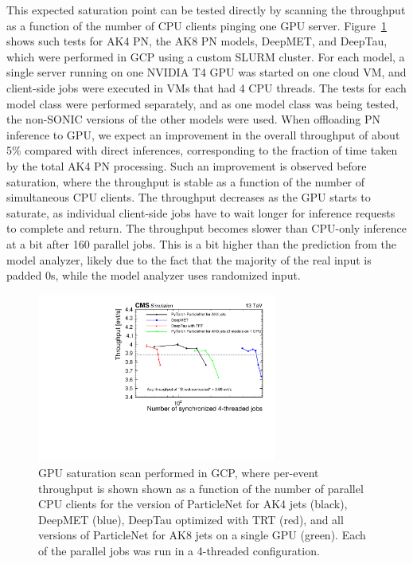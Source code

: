 This expected saturation point can be tested directly by scanning the throughput as a function of the number of CPU clients pinging one GPU server. Figure~\ref{fig:throughputs_scan_pn} shows such tests for AK4 PN, the AK8 PN models, DeepMET, and DeepTau, which were performed in GCP using a custom SLURM cluster. For each model, a single server running on one NVIDIA T4 GPU was started on one cloud VM, and client-side jobs were executed in VMs that had 4 CPU threads. The tests for each model class were performed separately, and as one model class was being tested, the non-SONIC versions of the other models were used.
When offloading PN inference to GPU, we expect an improvement in the overall throughput of about 5\% compared with direct inferences, corresponding to the fraction of time taken by the total AK4 PN processing. Such an improvement is observed before saturation, where the throughput is stable as a function of the number of simultaneous CPU clients. The throughput decreases as the GPU starts to saturate, as individual client-side jobs have to wait longer for inference requests to complete and return. The throughput becomes slower than CPU-only inference at a bit after 160 parallel jobs. This is a bit higher than the prediction from the model analyzer, likely due to the fact that the majority of the real input is padded 0s, while the model analyzer uses randomized input.
\begin{figure}[ht]
    \centering
    \includegraphics[width=0.70\textwidth]{plots/PN_throughput_scan_PT.pdf}
    \caption{GPU saturation scan performed in GCP, where per-event throughput is shown shown as a function of the number of parallel CPU clients for the \PYTORCH version of ParticleNet for AK4 jets (black), DeepMET (blue), DeepTau optimized with TRT (red), and all \PYTORCH versions of ParticleNet for AK8 jets on a single GPU (green). Each of the parallel jobs was run in a 4-threaded configuration.}
    \label{fig:throughputs_scan_pn}
\end{figure}

